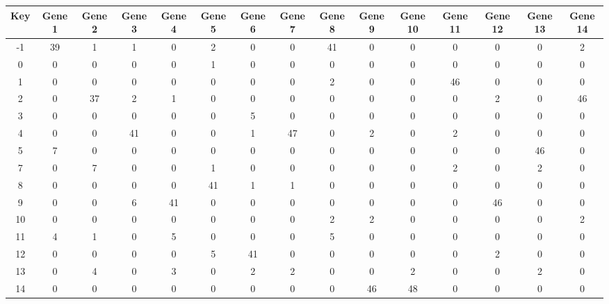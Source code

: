 \begin{tabular}{|c|c|c|c|c|c|c|c|c|c|c|c|c|c|c|}
\hline
Key & Gene 1 & Gene 2 & Gene 3 & Gene 4 & Gene 5 & Gene 6 & Gene 7 & Gene 8 & Gene 9 & Gene 10 & Gene 11 & Gene 12 & Gene 13 & Gene 14 \\
\hline
-1 & 39 & 1 & 1 & 0 & 2 & 0 & 0 & 41 & 0 & 0 & 0 & 0 & 0 & 2 \\
0 & 0 & 0 & 0 & 0 & 1 & 0 & 0 & 0 & 0 & 0 & 0 & 0 & 0 & 0 \\
1 & 0 & 0 & 0 & 0 & 0 & 0 & 0 & 2 & 0 & 0 & 46 & 0 & 0 & 0 \\
2 & 0 & 37 & 2 & 1 & 0 & 0 & 0 & 0 & 0 & 0 & 0 & 2 & 0 & 46 \\
3 & 0 & 0 & 0 & 0 & 0 & 5 & 0 & 0 & 0 & 0 & 0 & 0 & 0 & 0 \\
4 & 0 & 0 & 41 & 0 & 0 & 1 & 47 & 0 & 2 & 0 & 2 & 0 & 0 & 0 \\
5 & 7 & 0 & 0 & 0 & 0 & 0 & 0 & 0 & 0 & 0 & 0 & 0 & 46 & 0 \\
7 & 0 & 7 & 0 & 0 & 1 & 0 & 0 & 0 & 0 & 0 & 2 & 0 & 2 & 0 \\
8 & 0 & 0 & 0 & 0 & 41 & 1 & 1 & 0 & 0 & 0 & 0 & 0 & 0 & 0 \\
9 & 0 & 0 & 6 & 41 & 0 & 0 & 0 & 0 & 0 & 0 & 0 & 46 & 0 & 0 \\
10 & 0 & 0 & 0 & 0 & 0 & 0 & 0 & 2 & 2 & 0 & 0 & 0 & 0 & 2 \\
11 & 4 & 1 & 0 & 5 & 0 & 0 & 0 & 5 & 0 & 0 & 0 & 0 & 0 & 0 \\
12 & 0 & 0 & 0 & 0 & 5 & 41 & 0 & 0 & 0 & 0 & 0 & 2 & 0 & 0 \\
13 & 0 & 4 & 0 & 3 & 0 & 2 & 2 & 0 & 0 & 2 & 0 & 0 & 2 & 0 \\
14 & 0 & 0 & 0 & 0 & 0 & 0 & 0 & 0 & 46 & 48 & 0 & 0 & 0 & 0 \\
\hline
\end{tabular}